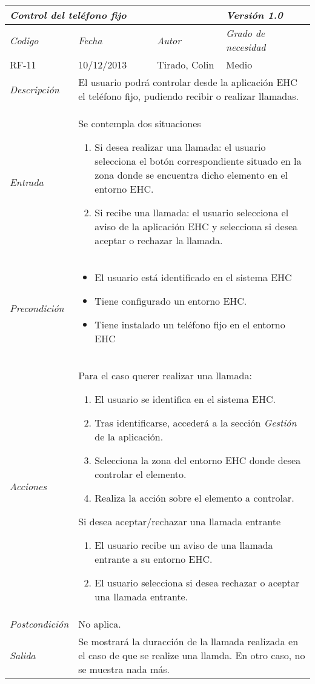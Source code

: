 \begin{tabular}{|p{3cm}|p{4cm}|p{4cm}|p{4cm}|}
\hline \multicolumn{3}{|p{9cm}|}{\textit{Control del tel\'efono fijo}} & \textit{Versi\'on 1.0} \\
\hline \textit{Codigo} & \textit{Fecha} & \textit{Autor} & \textit{Grado de necesidad} \\
RF-11 & 10/12/2013 & Tirado, Colin & Medio \\
\hline \textit{Descripci\'on} & \multicolumn{3}{|p{9cm}|}{El usuario podr\'a controlar desde la aplicaci\'on EHC el tel\'efono fijo, pudiendo recibir o realizar llamadas.} \\
\hline \textit{Entrada} & \multicolumn{3}{|p{9cm}|}{Se contempla dos situaciones
\begin{enumerate}
\item Si desea realizar una llamada: el usuario selecciona el bot\'on correspondiente situado en la zona donde se encuentra dicho elemento en el entorno EHC.
\item Si recibe una llamada: el usuario selecciona el aviso de la aplicaci\'on EHC y selecciona si desea aceptar o rechazar la llamada.
\end{enumerate}} \\
\hline \textit{Precondici\'on} & \multicolumn{3}{|p{9cm}|}{
\begin{itemize}
\item El usuario est\'a identificado en el sistema EHC
\item Tiene configurado un entorno EHC.
\item Tiene instalado un tel\'efono fijo en el entorno EHC
\end{itemize}
} \\
\hline \textit{Acciones} & \multicolumn{3}{|p{9cm}|}{
Para el caso querer realizar una llamada:
\begin{enumerate}
\item El usuario se identifica en el sistema EHC.
\item Tras identificarse, acceder\'a a la secci\'on \textit{Gesti\'on} de la aplicaci\'on.
\item Selecciona la zona del entorno EHC donde desea controlar el elemento.
\item Realiza la acci\'on sobre el elemento a controlar.
\end{enumerate}

Si desea aceptar/rechazar una llamada entrante
\begin{enumerate}
\item El usuario recibe un aviso de una llamada entrante a su entorno EHC.
\item El usuario selecciona si desea rechazar o aceptar una llamada entrante.
\end{enumerate}
} \\
\hline \textit{Postcondici\'on} & \multicolumn{3}{|p{9cm}|}{No aplica.} \\
\hline \textit{Salida} & \multicolumn{3}{|p{9cm}|}{Se mostrar\'a la duracci\'on de la llamada realizada en el caso de que se realize una llamda. En otro caso, no se muestra nada m\'as.} \\ \hline
\end{tabular}